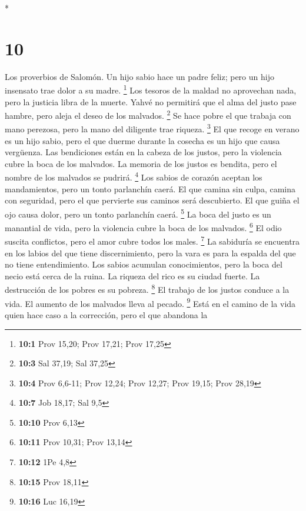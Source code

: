 \begin{paracol}{2}
\begin{otherlanguage}{english}
\end{otherlanguage}

\switchcolumn[0]*

\hypertarget{section-18}{%
\section{10}\label{section-18}}

 Los proverbios de Salomón. Un hijo sabio hace un padre
feliz; pero un hijo insensato trae dolor a su madre. \footnote{\textbf{10:1}
  Prov 15,20; Prov 17,21; Prov 17,25}  Los tesoros de la
maldad no aprovechan nada, pero la justicia libra de la muerte.
 Yahvé no permitirá que el alma del justo pase hambre,
pero aleja el deseo de los malvados. \footnote{\textbf{10:3} Sal 37,19;
  Sal 37,25}  Se hace pobre el que trabaja con mano
perezosa, pero la mano del diligente trae riqueza. \footnote{\textbf{10:4}
  Prov 6,6-11; Prov 12,24; Prov 12,27; Prov 19,15; Prov 28,19}
 El que recoge en verano es un hijo sabio, pero el que
duerme durante la cosecha es un hijo que causa vergüenza. 
Las bendiciones están en la cabeza de los justos, pero la violencia
cubre la boca de los malvados.  La memoria de los justos
es bendita, pero el nombre de los malvados se pudrirá. \footnote{\textbf{10:7}
  Job 18,17; Sal 9,5}  Los sabios de corazón aceptan los
mandamientos, pero un tonto parlanchín caerá.  El que
camina sin culpa, camina con seguridad, pero el que pervierte sus
caminos será descubierto.  El que guiña el ojo causa
dolor, pero un tonto parlanchín caerá. \footnote{\textbf{10:10} Prov
  6,13}  La boca del justo es un manantial de vida, pero
la violencia cubre la boca de los malvados. \footnote{\textbf{10:11}
  Prov 10,31; Prov 13,14}  El odio suscita conflictos,
pero el amor cubre todos los males. \footnote{\textbf{10:12} 1Pe 4,8}
 La sabiduría se encuentra en los labios del que tiene
discernimiento, pero la vara es para la espalda del que no tiene
entendimiento.  Los sabios acumulan conocimientos, pero
la boca del necio está cerca de la ruina.  La riqueza del
rico es su ciudad fuerte. La destrucción de los pobres es su pobreza.
\footnote{\textbf{10:15} Prov 18,11}  El trabajo de los
justos conduce a la vida. El aumento de los malvados lleva al pecado.
\footnote{\textbf{10:16} Luc 16,19}  Está en el camino de
la vida quien hace caso a la corrección, pero el que abandona la

\end{paracol}
